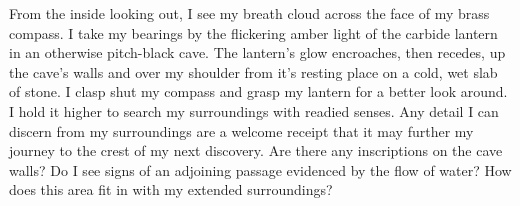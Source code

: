 From the inside looking out, I see my breath cloud across the face of my brass compass.
\reversemarginpar
{}
I take my bearings by the flickering amber light of the carbide lantern in an
otherwise pitch-black cave.
The lantern's glow encroaches, then recedes, up the cave's walls and over my
shoulder from it's resting place on a cold, wet slab of stone. I clasp shut
my compass and grasp my lantern for a better look around. I hold it higher to
search my surroundings with readied senses. Any detail I can discern from my
surroundings are a welcome receipt that it may further my journey to the crest
of my next discovery. Are there any inscriptions on the cave walls? Do I see
signs of an adjoining passage evidenced by the flow of water? How does this
area fit in with my extended surroundings?

